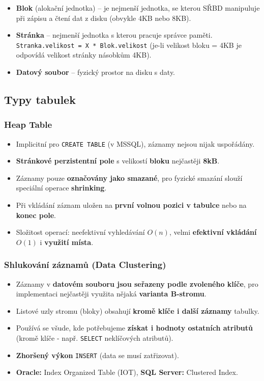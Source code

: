 \begin{itemize}
\item \textbf{Blok} (alokační jednotka) -- je nejmenší jednotka, se kterou SŘBD manipuluje při zápisu a čtení dat z disku (obvykle 4KB nebo 8KB).
\item \textbf{Stránka} -- nejmenší jednotka s kterou pracuje správce paměti. \texttt{Stranka.velikost = X * Blok.velikost} (je-li velikost bloku = 4KB je odpovídá velikost stránky násobkům 4KB).
\item \textbf{Datový soubor} -- fyzický prostor na disku s daty.
\end{itemize}


\subsection{Typy tabulek}
\subsubsection{Heap Table}
\begin{itemize}
\item Implicitní pro \texttt{CREATE TABLE} (v MSSQL), záznamy nejsou nijak uspořádány.
\item \textbf{Stránkové perzistentní pole} s velikostí \textbf{bloku} nejčastěji \textbf{8kB}.
\item Záznamy pouze \textbf{označovány jako smazané}, pro fyzické smazání slouží speciální operace \textbf{shrinking}.
\item Při vkládání záznam uložen na \textbf{první volnou pozici v tabulce} nebo na \textbf{konec pole}.
\item Složitost operací: neefektivní vyhledávání $O(n)$, velmi \textbf{efektivní vkládání} $O(1)$ i \textbf{využití místa}.
\end{itemize}
\subsubsection{Shlukování záznamů (Data Clustering)}
\begin{itemize}
\item Záznamy v \textbf{datovém souboru jsou seřazeny podle zvoleného klíče}, pro implementaci nejčastěji využita nějaká \textbf{varianta B-stromu}.
\item Listové uzly stromu (bloky) obsahují \textbf{kromě klíče i další záznamy} tabulky.
\item Používá se všude, kde potřebujeme \textbf{získat i hodnoty ostatních atributů} (kromě klíče - např. \texttt{SELECT} neklíčových atributů).
\item \textbf{Zhoršený výkon} \texttt{INSERT} (data se musí zatřizovat).
\item \textbf{Oracle:} Index Organized Table (IOT), \textbf{SQL Server:} Clustered Index.
\end{itemize}

